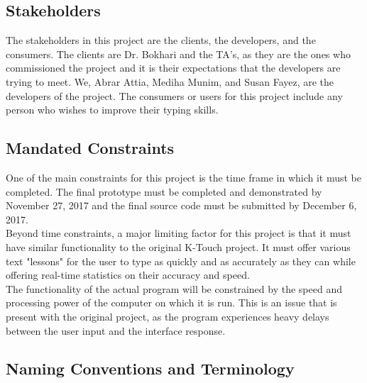 \documentclass[12pt, titlepage]{article}
\begin{document}
\subsection{Stakeholders}
\indent \indent The stakeholders in this project are the clients, the developers, and the consumers. The clients are Dr. Bokhari and the TA's, as they are the ones who commissioned the project and it is their expectations that the developers are trying to meet. We, Abrar Attia, Mediha Munim, and Susan Fayez, are the developers of the project. The consumers or users for this project include any person who wishes to improve their typing skills.

\subsection{Mandated Constraints}
\indent \indent One of the main constraints for this project is the time frame in which it must be completed. The final prototype must be completed and demonstrated by November 27, 2017 and the final source code must be submitted by December 6, 2017.
\\
\indent Beyond time constraints, a major limiting factor for this project is that it must have similar functionality to the original K-Touch project. It must offer various text "lessons" for the user to type as quickly and as accurately as they can while offering real-time statistics on their accuracy and speed. 
\\
\indent The functionality of the actual program will be constrained by the speed and processing power of the computer on which it is run. This is an issue that is present with the original project, as the program experiences heavy delays between the user input and the interface response.


\subsection{Naming Conventions and Terminology}
\end{document}
